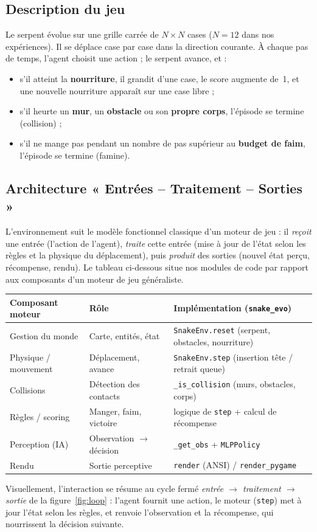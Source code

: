 \documentclass[11pt,a4paper]{article}
\begin{document}
\subsection{Description du jeu}
Le serpent évolue sur une grille carrée de $N \times N$ cases ($N=12$ dans nos
expériences). Il se déplace case par case dans la direction courante. À chaque
pas de temps, l'agent choisit une action ; le serpent avance, et :
\begin{itemize}[nosep]
  \item s'il atteint la \textbf{nourriture}, il grandit d'une case, le score
        augmente de~1, et une nouvelle nourriture apparaît sur une case libre ;
  \item s'il heurte un \textbf{mur}, un \textbf{obstacle} ou son \textbf{propre
        corps}, l'épisode se termine (collision) ;
  \item s'il ne mange pas pendant un nombre de pas supérieur au \textbf{budget de
        faim}, l'épisode se termine (famine).
\end{itemize}

\subsection{Architecture « Entrées -- Traitement -- Sorties »}
L'environnement suit le modèle fonctionnel classique d'un moteur de jeu : il
\emph{reçoit} une entrée (l'action de l'agent), \emph{traite} cette entrée (mise à
jour de l'état selon les règles et la physique du déplacement), puis \emph{produit}
des sorties (nouvel état perçu, récompense, rendu). Le tableau ci-dessous situe nos
modules de code par rapport aux composants d'un moteur de jeu généraliste.
\begin{center}
\begin{tabular}{lll}
\toprule
\textbf{Composant moteur} & \textbf{Rôle} & \textbf{Implémentation (\texttt{snake\_evo})} \\
\midrule
Gestion du monde & Carte, entités, état & \texttt{SnakeEnv.reset} (serpent, obstacles, nourriture) \\
Physique / mouvement & Déplacement, avance & \texttt{SnakeEnv.step} (insertion tête / retrait queue) \\
Collisions & Détection des contacts & \texttt{\_is\_collision} (murs, obstacles, corps) \\
Règles / scoring & Manger, faim, victoire & logique de \texttt{step} + calcul de récompense \\
Perception (IA) & Observation $\to$ décision & \texttt{\_get\_obs} + \texttt{MLPPolicy} \\
Rendu & Sortie perceptive & \texttt{render} (ANSI) / \texttt{render\_pygame} \\
\bottomrule
\end{tabular}
\end{center}
Visuellement, l'interaction se résume au cycle fermé \emph{entrée $\to$ traitement
$\to$ sortie} de la figure~\ref{fig:loop} : l'agent fournit une action, le moteur
(\texttt{step}) met à jour l'état selon les règles, et renvoie l'observation et la
récompense, qui nourrissent la décision suivante.
\end{document}
